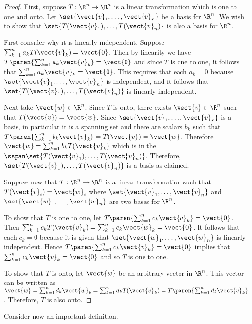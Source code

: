 \begin{proof}
First, suppose $T:\R^n \to \R^n$ is a linear
transformation which is one to one and onto. Let $\set{
\vect{v}_{1},\ldots,\vect{v}_{n}} $ be a basis for
$\R^n$. We wish to show that $\set{T(\vect{v}_{1}),\ldots,
T(\vect{v}_{n})} $ is also a basis for $\R^n$.

First consider why it is linearly independent. Suppose
$\sum_{k=1}^{n}a_{k}T(\vect{v}_{k})=\vect{0}$. Then by linearity we have $T\paren{
\sum_{k=1}^{n}a_{k}\vect{v}_{k}} =\vect{0}$ and since $T$ is one
to one, it follows that $\sum_{k=1}^{n}a_{k}\vect{v}_{k}=\vect{0}$.
This requires that  each $a_{k}=0$ because $\set{\vect{v}_{1},\ldots,
\vect{v}_{n}} $ is independent, and it follows that $\set{
T(\vect{v}_{1}),\ldots, T(\vect{v}_{n})} $ is linearly
independent.

Next take $\vect{w}\in \R^n$. Since $T$ is onto, there exists
$\vect{v}\in \R^n$ such that $T(\vect{v})=\vect{w}$. Since
$ \set{\vect{v}_{1},\ldots,\vect{v}_{n}}$ is a basis, in particular it
is a spanning set and there are scalars $b_{k}$ such that
$T\paren{\sum_{k=1}^{n}b_{k}\vect{v} _{k}} =T(\vect{v})
=\vect{w}$. Therefore $\vect{w} =\sum_{k=1}^{n}b_{k}T(\vect{v}_{k})$
which is in the
$\sspan\set{T(\vect{v}_{1}),\ldots,T(\vect{v}_{n})}$. Therefore,
$\set{T(\vect{v}_{1}),\ldots,T(\vect{v}_{n})}$ is a basis as
claimed.

Suppose now that $T: \R^n \to \R^n$ is a linear
transformation such that $T(\vect{v}_{i})=\vect{w}_{i}$ where
$\set{\vect{v} _{1},\ldots,\vect{v}_{n}} $ and $\set{
\vect{w}_{1},\ldots, \vect{w}_{n}} $ are two bases for
$\R^n$.

To show that $T$ is one to one, let $T\paren{
\sum_{k=1}^{n}c_{k}\vect{v}_{k}} =\vect{0}$. Then
$\sum_{k=1}^{n}c_{k}T(\vect{v}_{k})=\sum_{k=1}^{n}c_{k}\vect{w}_{k}=\vect{
0}$. It follows that each $c_{k} = 0$ because it is given that
$\set{\vect{w} _{1},\ldots,\vect{w}_{n}} $ is linearly
independent. Hence $T\paren{\sum_{k=1}^{n}c_{k}\vect{v}_{k}}
=\vect{0}$ implies that $\sum_{k=1}^{n}c_{k}\vect{v}_{k}=\vect{0}$ and
so $T$ is one to one.

To show that $T$ is onto, let $\vect{w}$ be an arbitrary vector in
$\R^n$. This vector can be written as $\vect{w} =
\sum_{k=1}^{n}d_k\vect{w}_k =
\sum_{k=1}^{n}d_{k}T(\vect{v}_{k})=T\paren{\sum_{k=1}^{n}d_{k}
\vect{v}_{k}}$.  Therefore, $T$ is also onto.
\end{proof}

Consider now an important definition.

